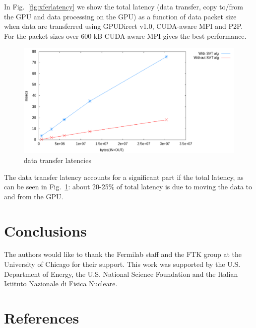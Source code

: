 \documentclass[letterpaper]{jpconf}
\begin{document}
In Fig.~\ref{fig:xferlatency} we show the total latency (data transfer, copy to/from the GPU and data processing on the GPU) as a function of data packet size when data are transferred using GPUDirect v1.0,
CUDA-aware MPI and P2P. For the packet sizes over 600 kB CUDA-aware MPI gives the best performance.


\begin{figure}[tbp]
  \centering
  \includegraphics[width=0.9\linewidth]{figures/cudaware.pdf}
  \caption{data transfer latencies}
  \label{fig:transferOnly}
\end{figure}

The data transfer latency accounts for a significant part if the total latency, 
as can be seen in Fig.~\ref{fig:transferOnly}: about 20-25\% of total latency  is due to moving the data to and from the GPU.


\section{Conclusions}


\ack
The authors would like to thank the Fermilab staff and the FTK group at the 
University of Chicago for their support. This work was supported by the
U.S. Department of Energy, the U.S. National Science Foundation and the Italian
Istituto Nazionale di Fisica Nucleare. 

\section*{References}












 
\end{document}
